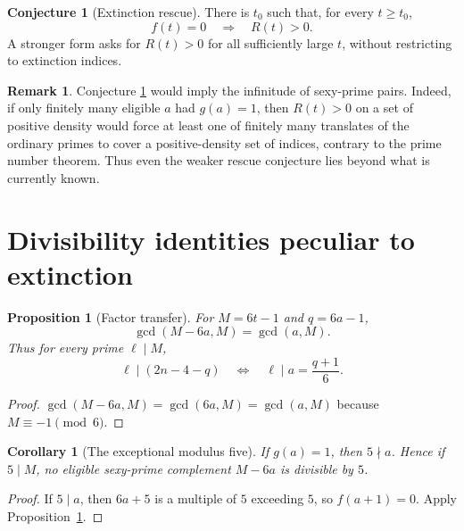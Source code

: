 \documentclass[11pt,a4paper]{article}
\newtheorem{proposition}[theorem]{Proposition}
\newtheorem{corollary}[theorem]{Corollary}
\theoremstyle{definition}
\newtheorem{conjecture}[theorem]{Conjecture}
\newtheorem{remark}[theorem]{Remark}
\begin{document}
\begin{conjecture}[Extinction rescue]\label{conj:rescue}
There is $t_0$ such that, for every $t\ge t_0$,
\begin{equation}\label{eq:target}
 f(t)=0\quad\Longrightarrow\quad R(t)>0.
\end{equation}
A stronger form asks for $R(t)>0$ for all sufficiently large $t$,
without restricting to extinction indices.
\end{conjecture}

\begin{remark}
Conjecture \ref{conj:rescue} would imply the infinitude of sexy-prime
pairs. Indeed, if only finitely many eligible $a$ had $g(a)=1$, then
$R(t)>0$ on a set of positive density would force at least one of
finitely many translates of the ordinary primes to cover a positive-density
set of indices, contrary to the prime number theorem. Thus even the weaker
rescue conjecture lies beyond what is currently known.
\end{remark}

\section{Divisibility identities peculiar to extinction}

\begin{proposition}[Factor transfer]\label{prop:gcd}
For $M=6t-1$ and $q=6a-1$,
\begin{equation}\label{eq:gcd}
 \boxed{\gcd(M-6a,M)=\gcd(a,M).}
\end{equation}
Thus for every prime $\ell\mid M$,
\begin{equation}
 \ell\mid(2n-4-q)\quad\Longleftrightarrow\quad
 \ell\mid a=\frac{q+1}{6}.
\end{equation}
\end{proposition}
\begin{proof}
$\gcd(M-6a,M)=\gcd(6a,M)=\gcd(a,M)$ because
$M\equiv-1\pmod6$.
\end{proof}

\begin{corollary}[The exceptional modulus five]\label{cor:five}
If $g(a)=1$, then $5\nmid a$. Hence if $5\mid M$,
no eligible sexy-prime complement $M-6a$ is divisible by $5$.
\end{corollary}
\begin{proof}
If $5\mid a$, then $6a+5$ is a multiple of $5$ exceeding $5$, so
$f(a+1)=0$. Apply Proposition~\ref{prop:gcd}.
\end{proof}
\end{document}
